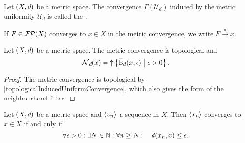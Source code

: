 \begin{definition}
Let $\left( X,d \right)$ be a metric space. The convergence $\Gamma(\mathcal{U}_d)$ induced by the metric uniformity $\mathcal{U}_d$ is called the .

If $F\in\operatorname{\mathcal{FP}}(X)$ converges to $x\in X$ in the metric convergence, we write $F\overset{d}{\longrightarrow} x$.
\end{definition}

\begin{lemma}
Let $\left( X,d \right)$ be a metric space. The metric convergence is topological and
\[ \operatorname{\mathcal{N}}_d(x) = \operatorname{\uparrow}\left\{ \operatorname{\overline{B}}_d(x,\epsilon) \;\middle|\; \epsilon >0 \right\}. \]
\end{lemma}
\begin{proof}
The metric convergence is topological by \ref{topologicalInducedUniformConvergence}, which also gives the form of the neighbourhood filter. 
\end{proof}
\begin{corollary}
Let $\left( X,d \right)$ be a metric space and $\left\langle x_n \right\rangle$ a sequence in $X$. Then $\left\langle x_n \right\rangle$ converges to $x\in X$ \textup{if and only if}
\[ \forall \epsilon>0: \exists N\in\mathbb{N}: \forall n\geq N: \quad d(x_n,x)\leq \epsilon. \]
\end{corollary}

